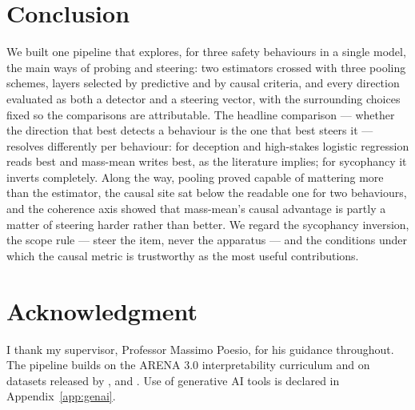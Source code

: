 \documentclass[conference]{IEEEtran}
\begin{document}
\section{Conclusion}

We built one pipeline that explores, for three safety behaviours in a single
model, the main ways of probing and steering: two estimators crossed with three
pooling schemes, layers selected by predictive and by causal criteria, and every
direction evaluated as both a detector and a steering vector, with the
surrounding choices fixed so the comparisons are attributable. The headline
comparison --- whether the direction that best detects a behaviour is the one
that best steers it --- resolves differently per behaviour: for deception and
high-stakes logistic regression reads best and mass-mean writes best, as the
literature implies; for sycophancy it inverts completely. Along the way, pooling
proved capable of mattering more than the estimator, the causal site sat below
the readable one for two behaviours, and the coherence axis showed that
mass-mean's causal advantage is partly a matter of steering harder rather than
better. We regard the sycophancy inversion, the scope rule --- steer the item,
never the apparatus --- and the conditions under which the causal metric is
trustworthy as the most useful contributions.

\section*{Acknowledgment}

I thank my supervisor, Professor Massimo Poesio, for his guidance
throughout. The pipeline builds on
the ARENA 3.0 interpretability curriculum \citep{arena2024} and on datasets
released by \citet{goldowsky2025}, \citet{mckenzie2025} and \citet{cincynlp2025}.
Use of generative AI tools is declared in Appendix~\ref{app:genai}.
\end{document}
